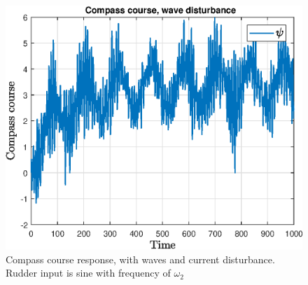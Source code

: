 \begin{figure}
    \centering
    \includegraphics[width = 1.00\textwidth]{figures/plots/P5p1c_heading_05.eps}
    \caption{Compass course response, with waves and current disturbance.  Rudder input is sine with frequency of $\omega_2$}
    \label{fig:p1c_heading_05}
\end{figure}

